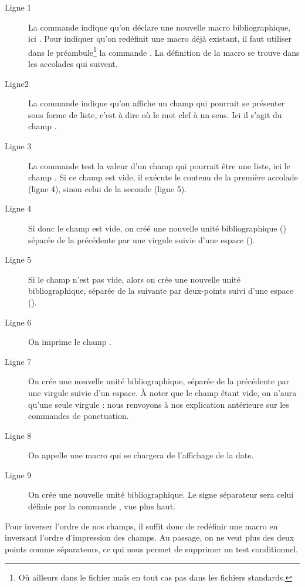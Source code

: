 \begin{description}
\item[Ligne 1]La commande  indique qu'on déclare une nouvelle macro bibliographique, ici . Pour indiquer qu'on redéfinit une macro déjà existant, il faut utiliser dans le préambule\footnote{Où ailleurs dans le fichier  mais en tout cas pas dans les fichiers standards.} la commande . La définition de la macro se trouve dans les accolades qui suivent.
\item[Ligne2]La commande  indique qu'on affiche un champ qui pourrait se présenter sous forme de liste, c'est à dire où le mot clef  à un sens. Ici il s'agit du champ . \item[Ligne 3]La commande  test la valeur d'un champ qui pourrait être une liste, ici le champ . Si ce champ est vide, il exécute le contenu de la première accolade (ligne 4), sinon celui de la seconde (ligne 5).
\item[Ligne 4]Si donc le champ  est vide, on créé une nouvelle unité bibliographique () séparée de la précédente par une virgule suivie d'une espace ().
\item[Ligne 5]Si le champ  n'est pas vide, alors on crée une nouvelle unité bibliographique, séparée de la suivante par deux-points suivi d'une espace ().
\item[Ligne 6]On imprime le champ .
\item[Ligne 7]On crée une nouvelle unité bibliographique, séparée de la précédente par une virgule suivie d'un espace. À noter que le champ  étant vide, on n'aura qu'une seule virgule : nous renvoyons à nos explication antérieure sur les commandes de ponctuation.
\item[Ligne 8]On appelle une macro qui se chargera de l'affichage de la date.
\item[Ligne 9]On crée une nouvelle unité bibliographique. Le signe séparateur sera celui définie par la commande , vue plus haut.
\end{description}

Pour inverser l'ordre de nos champs, il suffit donc de redéfinir une macro en inversant l'ordre d'impression des champs. Au passage, on ne veut plus des deux points comme séparateurs, ce qui nous permet de supprimer un test conditionnel.


